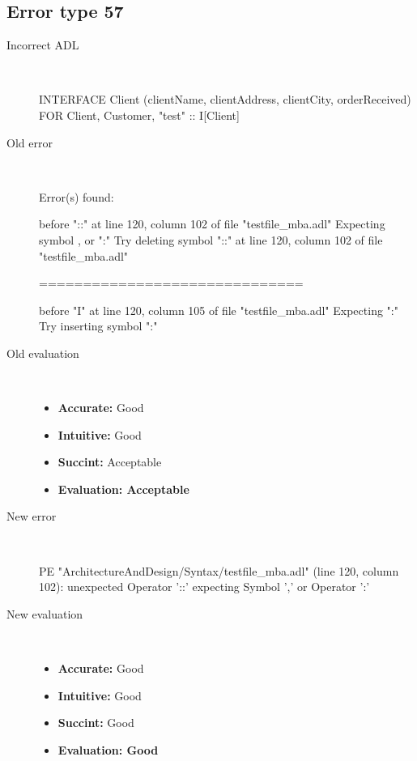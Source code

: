 \hrulefill

\subsection{Error type 57}
  \begin{description}
  \item[Incorrect ADL]~\\
\begin{adl}
INTERFACE Client (clientName, clientAddress, clientCity, orderReceived) FOR Client, Customer, "test" :: I[Client]\end{adl}
  \item[Old error]~\\
\begin{haskell}
Error(s) found:

before "::" at line 120, column 102 of file "testfile_mba.adl"
Expecting symbol , or ":"
Try deleting symbol "::" at line 120, column 102 of file "testfile_mba.adl"

==============================

before "I" at line 120, column 105 of file "testfile_mba.adl"
Expecting ":"
Try inserting symbol ":"

\end{haskell}
  \item[Old evaluation]~\\
    \begin{itemize}
    \item \textbf{Accurate:} Good
    \item \textbf{Intuitive:} Good
    \item \textbf{Succint:} Acceptable
    \item \textbf{Evaluation: Acceptable}
    \end{itemize}
  \item[New error]~\\
\begin{haskell}
PE "ArchitectureAndDesign/Syntax/testfile_mba.adl" (line 120, column 102):
unexpected Operator '::'
expecting Symbol ',' or Operator ':'
\end{haskell}
  \item[New evaluation]~\\
    \begin{itemize}
    \item \textbf{Accurate:} Good
    \item \textbf{Intuitive:} Good
    \item \textbf{Succint:} Good
    \item \textbf{Evaluation: Good
}
    \end{itemize}
  \end{description}

